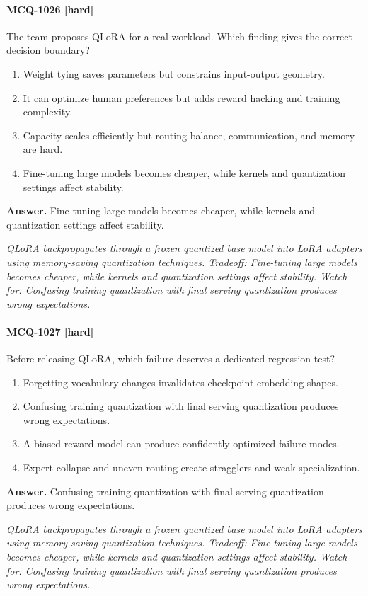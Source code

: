 \paragraph{MCQ-1026 [hard]} The team proposes QLoRA for a real workload. Which finding gives the correct decision boundary?
\begin{enumerate}[label=\Alph*.]
\item Weight tying saves parameters but constrains input-output geometry.
\item It can optimize human preferences but adds reward hacking and training complexity.
\item Capacity scales efficiently but routing balance, communication, and memory are hard.
\item Fine-tuning large models becomes cheaper, while kernels and quantization settings affect stability.
\end{enumerate}
\noindent\textbf{Answer.} Fine-tuning large models becomes cheaper, while kernels and quantization settings affect stability.
\par\textit{QLoRA backpropagates through a frozen quantized base model into LoRA adapters using memory-saving quantization techniques. Tradeoff: Fine-tuning large models becomes cheaper, while kernels and quantization settings affect stability. Watch for: Confusing training quantization with final serving quantization produces wrong expectations.}
\paragraph{MCQ-1027 [hard]} Before releasing QLoRA, which failure deserves a dedicated regression test?
\begin{enumerate}[label=\Alph*.]
\item Forgetting vocabulary changes invalidates checkpoint embedding shapes.
\item Confusing training quantization with final serving quantization produces wrong expectations.
\item A biased reward model can produce confidently optimized failure modes.
\item Expert collapse and uneven routing create stragglers and weak specialization.
\end{enumerate}
\noindent\textbf{Answer.} Confusing training quantization with final serving quantization produces wrong expectations.
\par\textit{QLoRA backpropagates through a frozen quantized base model into LoRA adapters using memory-saving quantization techniques. Tradeoff: Fine-tuning large models becomes cheaper, while kernels and quantization settings affect stability. Watch for: Confusing training quantization with final serving quantization produces wrong expectations.}
